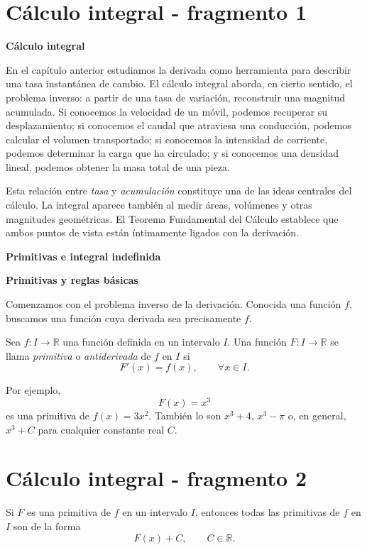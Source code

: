 
\section{Cálculo integral - fragmento 1}
\textbf{Cálculo integral}

En el capítulo anterior estudiamos la derivada como herramienta para describir una tasa instantánea de cambio. El cálculo integral aborda, en cierto sentido, el problema inverso: a partir de una tasa de variación, reconstruir una magnitud acumulada. Si conocemos la velocidad de un móvil, podemos recuperar su desplazamiento; si conocemos el caudal que atraviesa una conducción, podemos calcular el volumen transportado; si conocemos la intensidad de corriente, podemos determinar la carga que ha circulado; y si conocemos una densidad lineal, podemos obtener la masa total de una pieza.

Esta relación entre \emph{tasa} y \emph{acumulación} constituye una de las ideas centrales del cálculo. La integral aparece también al medir áreas, volúmenes y otras magnitudes geométricas. El Teorema Fundamental del Cálculo establece que ambos puntos de vista están íntimamente ligados con la derivación.

\textbf{Primitivas e integral indefinida}

\textbf{Primitivas y reglas básicas}

Comenzamos con el problema inverso de la derivación. Conocida una función $f$, buscamos una función cuya derivada sea precisamente $f$.

\begin{definition}[Primitiva]
Sea $f:I\to\mathbb{R}$ una función definida en un intervalo $I$. Una función $F:I\to\mathbb{R}$ se llama \emph{primitiva} o \emph{antiderivada} de $f$ en $I$ si
\[
F'(x)=f(x),\qquad \forall x\in I.
\]
\end{definition}

Por ejemplo,
\[
F(x)=x^3
\]
es una primitiva de $f(x)=3x^2$. También lo son $x^3+4$, $x^3-\pi$ o, en general, $x^3+C$ para cualquier constante real $C$.


\section{Cálculo integral - fragmento 2}
\begin{theorem}
Si $F$ es una primitiva de $f$ en un intervalo $I$, entonces todas las primitivas de $f$ en $I$ son de la forma
\[
F(x)+C,\qquad C\in\mathbb{R}.
\]
\end{theorem}

